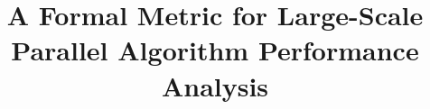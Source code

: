 \documentclass[conference]{IEEEtran}
\begin{document}
\sloppy

%
\title{A Formal Metric for Large-Scale Parallel Algorithm Performance Analysis}



\author{
}


% 
\end{document}
